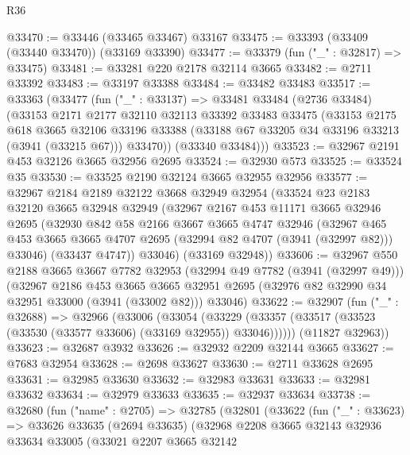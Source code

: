 \begin{lexlean}{R36}
\begin{coremodule}
@33470 := @33446 (@33465 @33467) @33167
@33475 := @33393 (@33409 (@33440 @33470)) (@33169 @33390)
@33477 := @33379 (fun ("_" : @32817) => @33475)
@33481 := @33281 @220 @2178 @32114 @3665
@33482 := @2711 @33392
@33483 := @33197 @33388
@33484 := @33482 @33483
@33517 := @33363
    (@33477
      (fun ("_" : @33137) =>
      @33481
        @33484
        (@2736 @33484)
        (@33153
          @2171
          @2177
          @32110
          @32113
          @33392
          @33483
          @33475
          (@33153
            @2175
            @618
            @3665
            @32106
            @33196
            @33388
            (@33188 @67 @33205 @34 @33196 @33213 (@3941 (@33215 @67)))
            @33470))
        (@33340 @33484)))
@33523 := @32967 @2191 @453 @32126 @3665 @32956 @2695
@33524 := @32930 @573
@33525 := @33524 @35
@33530 := @33525 @2190 @32124 @3665 @32955 @32956
@33577 := @32967
    @2184
    @2189
    @32122
    @3668
    @32949
    @32954
    (@33524
      @23
      @2183
      @32120
      @3665
      @32948
      @32949
      (@32967
        @2167
        @453
        @11171
        @3665
        @32946
        @2695
        (@32930
          @842
          @58
          @2166
          @3667
          @3665
          @4747
          @32946
          (@32967 @465 @453 @3665 @3665 @4707 @2695 (@32994 @82 @4707 (@3941 (@32997 @82))) @33046)
          (@33437 @4747))
        @33046)
      (@33169 @32948))
@33606 := @32967
    @550
    @2188
    @3665
    @3667
    @7782
    @32953
    (@32994 @49 @7782 (@3941 (@32997 @49)))
    (@32967
      @2186
      @453
      @3665
      @3665
      @32951
      @2695
      (@32976 @82 @32990 @34 @32951 @33000 (@3941 (@33002 @82)))
      @33046)
@33622 := @32907
    (fun ("_" : @32688) =>
    @32966
      (@33006
        (@33054
          (@33229 (@33357 (@33517 (@33523 (@33530 (@33577 @33606) (@33169 @32955)) @33046))))))
      (@11827 @32963))
@33623 := @32687 @3932
@33626 := @32932 @2209 @32144 @3665
@33627 := @7683 @32954
@33628 := @2698 @33627
@33630 := @2711 @33628 @2695
@33631 := @32985 @33630
@33632 := @32983 @33631
@33633 := @32981 @33632
@33634 := @32979 @33633
@33635 := @32937 @33634
@33738 := @32680
    (fun ("name" : @2705) =>
    @32785
      (@32801
        (@33622
          (fun ("_" : @33623) =>
          @33626
            @33635
            (@2694 @33635)
            (@32968
              @2208
              @3665
              @32143
              @32936
              @33634
              @33005
              (@33021
                @2207
                @3665
                @32142

\end{coremodule}
\end{lexlean}

